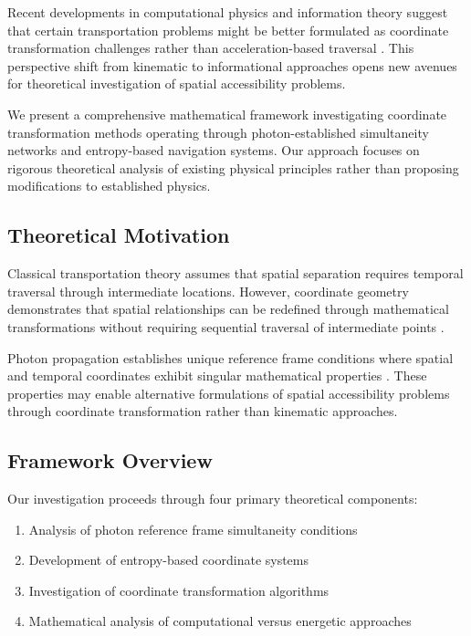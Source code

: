 \documentclass[12pt,a4paper]{article}
\begin{document}
Recent developments in computational physics and information theory suggest that certain transportation problems might be better formulated as coordinate transformation challenges rather than acceleration-based traversal \cite{lloyd2000ultimate, nielsen2010quantum}. This perspective shift from kinematic to informational approaches opens new avenues for theoretical investigation of spatial accessibility problems.

We present a comprehensive mathematical framework investigating coordinate transformation methods operating through photon-established simultaneity networks and entropy-based navigation systems. Our approach focuses on rigorous theoretical analysis of existing physical principles rather than proposing modifications to established physics.

\subsection{Theoretical Motivation}

Classical transportation theory assumes that spatial separation requires temporal traversal through intermediate locations. However, coordinate geometry demonstrates that spatial relationships can be redefined through mathematical transformations without requiring sequential traversal of intermediate points \cite{spivak1979differential}.

Photon propagation establishes unique reference frame conditions where spatial and temporal coordinates exhibit singular mathematical properties \cite{rindler2001introduction}. These properties may enable alternative formulations of spatial accessibility problems through coordinate transformation rather than kinematic approaches.

\subsection{Framework Overview}

Our investigation proceeds through four primary theoretical components:

\begin{enumerate}
\item Analysis of photon reference frame simultaneity conditions
\item Development of entropy-based coordinate systems  
\item Investigation of coordinate transformation algorithms
\item Mathematical analysis of computational versus energetic approaches
\end{enumerate}
\end{document}
